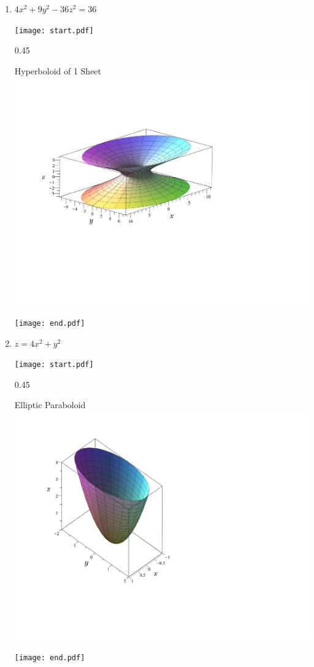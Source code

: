 \documentclass[12pt]{article}
\begin{document}
\begin{enumerate}
\item $4x^2+9y^2-36z^2=36$

\texttt{[image: start.pdf]}
{{{0.45\linewidth}{\begin{center}Hyperboloid of 1 Sheet\\\includegraphics[scale=0.4]{hyperboloid1.pdf}\end{center}}}}
\texttt{[image: end.pdf]}


\item $z=4x^2+y^2$

\texttt{[image: start.pdf]}
{{{0.45\linewidth}{\begin{center}Elliptic Paraboloid\\\includegraphics[scale=0.4]{paraboloid3.pdf}\end{center}}}}
\texttt{[image: end.pdf]}



\end{enumerate}
\end{document}
